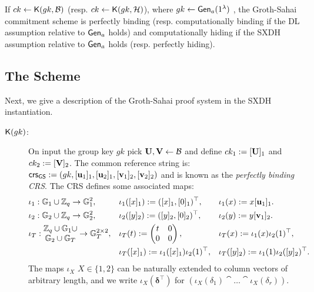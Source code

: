 \begin{theorem} If $ck\gets\mathsf{K}(gk,\mathcal{B})$ (resp. $ck\gets\mathsf{K}(gk,\mathcal{H})$), where $gk\gets\mathsf{Gen}_a(1^\lambda)$ , the Groth-Sahai commitment scheme is perfectly binding (resp. computationally binding if the DL assumption relative to $\mathsf{Gen}_a$ holds) and computationally hiding if the SXDH assumption relative to $\mathsf{Gen}_a$ holds (resp. perfectly hiding).

\end{theorem}

\subsection{The Scheme} \label{sec:gs-proofs-scheme}
Next, we give a description of the Groth-Sahai proof system in the SXDH instantiation.
\begin{description}
\item[$\mathsf{K}(gk)$:]  On input the group key $gk$ pick $\mathbf{{U}},\mathbf{{V}}\gets\mathcal{B}$ and define $ck_1 := [\mathbf{{U}}]_1$ and $ck_2:=[\mathbf{{V}}]_2$.
   The common reference string is:
   $\mathsf{crs}_{\mathsf{GS}}:=(gk,[\mathbf{u}_1]_1,[\mathbf{u}_2]_1,[\mathbf{v}_1]_2,[\mathbf{v}_2]_2)$ and is known as the \emph{perfectly binding CRS}.
The CRS defines some associated maps:
\begin{align*}
&\iota_1: \mathbb{G}_1 \cup \mathbb{Z}_q \rightarrow \mathbb{G}_1^2,& &\iota_1([x]_1):=([x]_1,[0]_1)^\top,& &\iota_1(x):=x[\mathbf{u}_1]_1. \\
&\iota_2: \mathbb{G}_2 \cup \mathbb{Z}_q \rightarrow \mathbb{G}_2^2,& &\iota_2([y]_2):=([y]_2,[0]_2)^\top,& &\iota_2(y):=y[\mathbf{v}_1]_2.\\
&\iota_T: \begin{matrix}\mathbb{Z}_q\cup\mathbb{G}_1\cup\\\mathbb{G}_2\cup\mathbb{G}_T\end{matrix} \rightarrow \mathbb{G}_T^{2\times2}, &
    &\iota_T(t):=\left(\begin{matrix}t & 0 \\ 0 & 0\end{matrix}\right),& & \iota_T(x) := \iota_1(x)\iota_2(1)^\top,\\
&                                       & &\iota_T([x]_1):=\iota_1([x]_1)\iota_2(1)^\top,& &\iota_T([y]_2) := \iota_1(1)\iota_2([y]_2)^\top.
\end{align*}
The maps $\iota_X$ $X \in \{1,2\}$ can be naturally extended to column vectors of arbitrary length, and we write $\iota_X(\boldsymbol \delta^{\top})$ for 
$(\iota_X(\delta_1)\cat \ldots \cat\iota_X(\delta_r))$.


\end{description}
